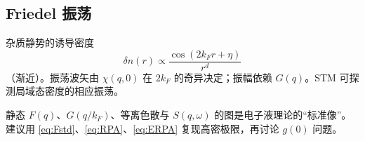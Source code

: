\subsection{Friedel 振荡}

杂质静势的诱导密度
\begin{equation}
  \delta n(r)
  \propto
  \frac{\cos(2k_F r+\eta)}{r^{d}}
\end{equation}
（渐近）。振荡波矢由 $\chi(q,0)$ 在 $2k_F$ 的奇异决定；振幅依赖 $G(q)$。STM 可探测局域态密度的相应振荡。

\begin{example}[对照 GV]
静态 $F(q)$、$G(q/k_F)$、等离色散与 $S(q,\omega)$ 的图是电子液理论的“标准像”。建议用 \eqref{eq:Fstd}、\eqref{eq:RPA}、\eqref{eq:ERPA} 复现高密极限，再讨论 $g(0)$ 问题。
\end{example}
